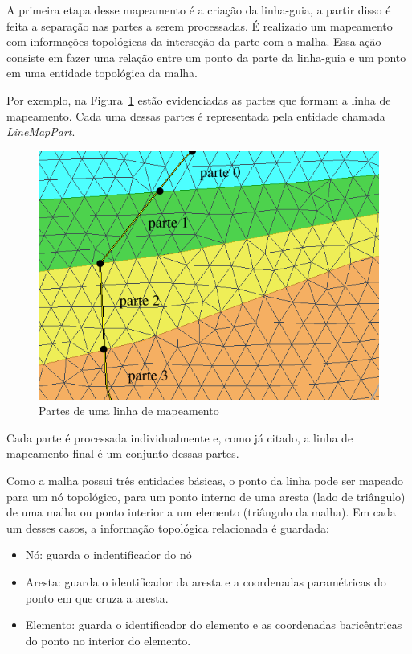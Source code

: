 A primeira etapa desse mapeamento é a criação da linha-guia, a partir disso é feita a separação nas partes a serem processadas. É realizado um mapeamento com informações topológicas da interseção da parte com a malha. Essa ação consiste em fazer uma relação entre um ponto da parte da linha-guia e um ponto em uma entidade topológica da malha.

Por exemplo, na Figura~\ref{fig-linemap-parts} estão evidenciadas as partes que formam a linha de mapeamento. Cada uma dessas partes é representada pela entidade chamada \textit{LineMapPart}.

\begin{figure} [h]
  \begin{center}
    \includegraphics[width=350pt]{images/fig-lm-parts}
    \caption{Partes de uma linha de mapeamento}\label{fig-linemap-parts}
  \end{center}
\end{figure}

Cada parte é processada individualmente e, como já citado, a linha de mapeamento final é um conjunto dessas partes.

Como a malha possui três entidades básicas, o ponto da linha pode ser mapeado para um nó topológico, para um ponto interno de uma aresta (lado de triângulo) de uma malha ou ponto interior a um elemento (triângulo da malha). Em cada um desses casos, a informação topológica relacionada é guardada:

\renewcommand{\labelitemi}{•}
\begin{itemize}
  \item Nó: guarda o indentificador do nó
  \item Aresta: guarda o identificador da aresta e a coordenadas paramétricas do ponto em que cruza a aresta.
  \item Elemento: guarda o identificador do elemento e as coordenadas baricêntricas do ponto no interior do elemento.
\end{itemize}

